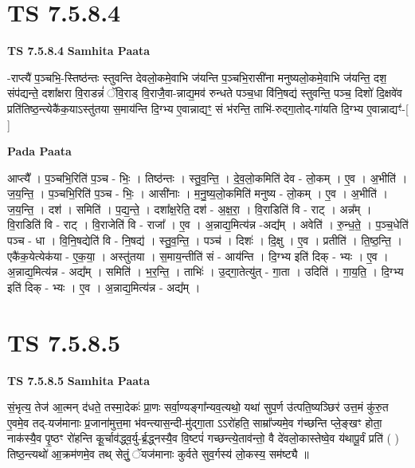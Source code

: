 \documentclass[17pt]{extarticle}
\begin{document}
\section*{ TS 7.5.8.4 }

\textbf{TS 7.5.8.4 } \newline
\textbf{Samhita Paata} \newline

-राप्त्यै॑ प॒ञ्चभि॒-स्तिष्ठ॑न्तः स्तुवन्ति देवलो॒कमे॒वाभि ज॑यन्ति प॒ञ्चभि॒रासी॑ना मनुष्यलो॒कमे॒वाभि ज॑यन्ति॒ दश॒ संप॑द्यन्ते॒ दशा᳚क्षरा वि॒राडन्नं॑ ॅवि॒राड् वि॒राजै॒वा-न्नाद्य॒मव॑ रुन्धते पञ्च॒धा वि॑नि॒षद्य॑ स्तुवन्ति॒ पञ्च॒ दिशो॑ दि॒क्षवे॑व प्रति॑तिष्ठ॒न्त्येकै॑क॒याऽस्तु॑तया स॒माय॑न्ति दि॒ग्भ्य ए॒वान्नाद्यꣳ॒॒ सं भ॑रन्ति॒ ताभि॑-रुद्गा॒तोद्-गा॑यति दि॒ग्भ्य ए॒वान्नाद्यꣳ॑-[  ] \newline

\textbf{Pada Paata} \newline

आप्त्यै᳚ । प॒ञ्चभि॒रिति॑ प॒ञ्च - भिः॒ । तिष्ठ॑न्तः । स्तु॒व॒न्ति॒ । दे॒व॒लो॒कमिति॑ देव - लो॒कम् । ए॒व । अ॒भीति॑ । ज॒य॒न्ति॒ । प॒ञ्चभि॒रिति॑ प॒ञ्च - भिः॒ । आसी॑नाः । म॒नु॒ष्य॒लो॒कमिति॑ मनुष्य - लो॒कम् । ए॒व । अ॒भीति॑ । ज॒य॒न्ति॒ । दश॑ । समिति॑ । प॒द्य॒न्ते॒ । दशा᳚क्ष॒रेति॒ दश॑ - अ॒क्ष॒रा॒ । वि॒राडिति॑ वि - राट् । अन्न᳚म् । वि॒राडिति॑ वि - राट् । वि॒राजेति॑ वि - राजा᳚ । ए॒व । अ॒न्नाद्य॒मित्य॑न्न -अद्य᳚म् । अवेति॑ । रु॒न्ध॒ते॒ । प॒ञ्च॒धेति॑ पञ्च - धा । वि॒नि॒षद्येति॑ वि - नि॒षद्य॑ । स्तु॒व॒न्ति॒ । पञ्च॑ । दिशः॑ । दि॒क्षु । ए॒व । प्रतीति॑ । ति॒ष्ठ॒न्ति॒ । एकै॑क॒येत्येक॑या - ए॒क॒या॒ । अस्तु॑तया । स॒माय॒न्तीति॑ सं - आय॑न्ति । दि॒ग्भ्य इति॑ दिक् - भ्यः । ए॒व । अ॒न्नाद्य॒मित्य॑न्न - अद्य᳚म् । समिति॑ । भ॒र॒न्ति॒ । ताभिः॑ । उ॒द्गा॒तेत्यु॑त् - गा॒ता । उदिति॑ । गा॒य॒ति॒ । दि॒ग्भ्य इति॑ दिक् - भ्यः । ए॒व । अ॒न्नाद्य॒मित्य॑न्न - अद्य᳚म् ।  \newline




\section*{ TS 7.5.8.5 }

\textbf{TS 7.5.8.5 } \newline
\textbf{Samhita Paata} \newline

सं॒भृत्य॒ तेज॑ आ॒त्मन् द॑धते॒ तस्मा॒देकः॑ प्रा॒णः सर्वा॒ण्यङ्गा᳚न्यव॒त्यथो॒ यथा॑ सुप॒र्ण उ॑त्पति॒ष्यञ्छिर॑ उत्त॒मं कु॑रु॒त ए॒वमे॒व तद्-यज॑मानाः प्र॒जाना॑मुत्त॒मा भ॑वन्त्यास॒न्दी-मु॑द्गा॒ता ऽऽरो॑हति॒ साम्रा᳚ज्यमे॒व ग॑च्छन्ति प्ले॒ङ्खꣳ होता॒ नाक॑स्यै॒व पृ॒ष्ठꣳ रो॑हन्ति कू॒र्चाव॑द्ध्व॒र्यु-र्ब्र॒द्ध्नस्यै॒व वि॒ष्टपं॑ गच्छन्त्ये॒ताव॑न्तो॒ वै दे॑वलो॒कास्तेष्वे॒व य॑थापू॒र्वं प्रति॑ ( ) तिष्ठ॒न्त्यथो॑ आ॒क्रम॑णमे॒व तथ् सेतुं॒ ॅयज॑मानाः कुर्वते सुव॒र्गस्य॑ लो॒कस्य॒ सम॑ष्ट्यै ॥ \newline
\end{document}
